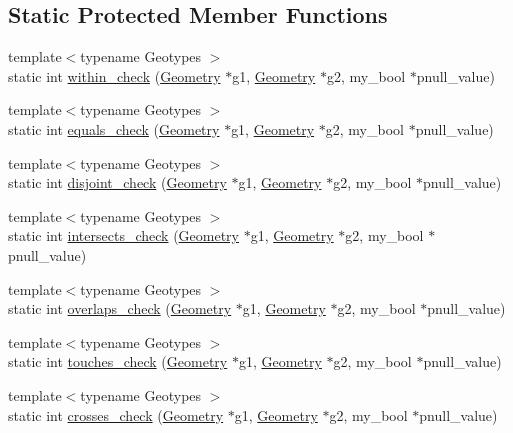 \subsection*{Static Protected Member Functions}
\begin{DoxyCompactItemize}
\item 
{\footnotesize template$<$typename Geotypes $>$ }\\static int \mbox{\hyperlink{classItem__func__spatial__rel_ae1fb968e1929493f368f20b3d8623172}{within\+\_\+check}} (\mbox{\hyperlink{classGeometry}{Geometry}} $\ast$g1, \mbox{\hyperlink{classGeometry}{Geometry}} $\ast$g2, my\+\_\+bool $\ast$pnull\+\_\+value)
\item 
{\footnotesize template$<$typename Geotypes $>$ }\\static int \mbox{\hyperlink{classItem__func__spatial__rel_a07ac590f37090b2259f70d90997e4612}{equals\+\_\+check}} (\mbox{\hyperlink{classGeometry}{Geometry}} $\ast$g1, \mbox{\hyperlink{classGeometry}{Geometry}} $\ast$g2, my\+\_\+bool $\ast$pnull\+\_\+value)
\item 
{\footnotesize template$<$typename Geotypes $>$ }\\static int \mbox{\hyperlink{classItem__func__spatial__rel_aef573b242f651daecaafbe29b7d7a1b0}{disjoint\+\_\+check}} (\mbox{\hyperlink{classGeometry}{Geometry}} $\ast$g1, \mbox{\hyperlink{classGeometry}{Geometry}} $\ast$g2, my\+\_\+bool $\ast$pnull\+\_\+value)
\item 
{\footnotesize template$<$typename Geotypes $>$ }\\static int \mbox{\hyperlink{classItem__func__spatial__rel_afc8cd84511557ea2093e5f8a53c73597}{intersects\+\_\+check}} (\mbox{\hyperlink{classGeometry}{Geometry}} $\ast$g1, \mbox{\hyperlink{classGeometry}{Geometry}} $\ast$g2, my\+\_\+bool $\ast$pnull\+\_\+value)
\item 
{\footnotesize template$<$typename Geotypes $>$ }\\static int \mbox{\hyperlink{classItem__func__spatial__rel_aadece652120a6d3b1b7cec48ccd29dd6}{overlaps\+\_\+check}} (\mbox{\hyperlink{classGeometry}{Geometry}} $\ast$g1, \mbox{\hyperlink{classGeometry}{Geometry}} $\ast$g2, my\+\_\+bool $\ast$pnull\+\_\+value)
\item 
{\footnotesize template$<$typename Geotypes $>$ }\\static int \mbox{\hyperlink{classItem__func__spatial__rel_abd51852f8be3c294137db766a871888b}{touches\+\_\+check}} (\mbox{\hyperlink{classGeometry}{Geometry}} $\ast$g1, \mbox{\hyperlink{classGeometry}{Geometry}} $\ast$g2, my\+\_\+bool $\ast$pnull\+\_\+value)
\item 
{\footnotesize template$<$typename Geotypes $>$ }\\static int \mbox{\hyperlink{classItem__func__spatial__rel_aa05fab976093b5f19cd03a73534d3946}{crosses\+\_\+check}} (\mbox{\hyperlink{classGeometry}{Geometry}} $\ast$g1, \mbox{\hyperlink{classGeometry}{Geometry}} $\ast$g2, my\+\_\+bool $\ast$pnull\+\_\+value)
\end{DoxyCompactItemize}
